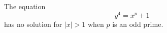 \begin{proposition}\label{eq:171}
    The equation
\[
    y^4=x^p+1
\]
    has no solution for $|x|>1$ when $p$ is an odd prime.
\end{proposition}

